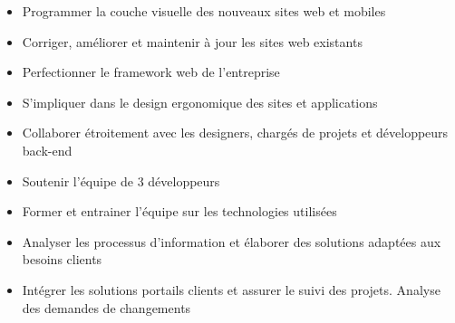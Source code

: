 \documentclass[10pt,a4paper]{altacv}
\begin{document}
\divider

\begin{itemize}
\item Programmer la couche visuelle des nouveaux sites web et mobiles
\item Corriger, améliorer et maintenir à jour les sites web existants
\item Perfectionner le framework web de l’entreprise
\item S’impliquer dans le design ergonomique des sites et applications
\item Collaborer étroitement avec les designers, chargés de projets et développeurs back-end
\end{itemize}

\divider

\begin{itemize}
\item Soutenir l’équipe de 3 développeurs
\item Former et entrainer l’équipe sur les technologies utilisées
\item Analyser les processus d’information et élaborer des solutions adaptées aux besoins clients
\item Intégrer les solutions portails clients et assurer le suivi des projets. Analyse des demandes de changements
\end{itemize}
\divider
{}


\end{document}

